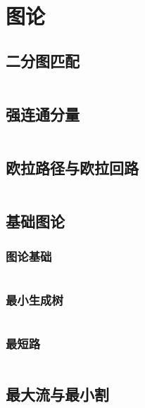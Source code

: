 \chapter{图论}

\section{二分图匹配}

\inputminted{cpp}{code/GraphTheory/BipartiteGraph/Hungarian.cpp}

\section{强连通分量}

\inputminted{cpp}{code/GraphTheory/Connectivity/SCC.cpp}

\section{欧拉路径与欧拉回路}

\inputminted{cpp}{code/GraphTheory/EulerianGraph/Hierholzer.cpp}

\section{基础图论}

\subsection{图论基础}

\inputminted{cpp}{code/GraphTheory/Graph/Basic.cpp}

\subsection{最小生成树}

\inputminted{cpp}{code/GraphTheory/Graph/MinSpanningTree.cpp}

\subsection{最短路}

\inputminted{cpp}{code/GraphTheory/Graph/ShortestPath.cpp}

\section{最大流与最小割}

